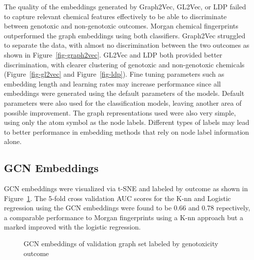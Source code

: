 \documentclass[
  super,
  preprint,
  3p]{elsarticle}
\begin{document}
The quality of the embeddings generated by Graph2Vec, GL2Vec, or LDP
failed to capture relevant chemical features effectively to be able to
discriminate between genotoxic and non-genotoxic outcomes. Morgan
chemical fingerprints outperformed the graph embeddings using both
classifiers. Graph2Vec struggled to separate the data, with almost no
discrimination between the two outcomes as shown in
Figure~\ref{fig-graph2vec}. GL2Vec and LDP both provided better
discrimination, with clearer clustering of genotoxic and non-genotoxic
chemicals (Figure~\ref{fig-gl2vec} and Figure~\ref{fig-ldp}). Fine
tuning parameters such as embedding length and learning rates may
increase performance since all embeddings were generated using the
default parameters of the models. Default parameters were also used for
the classification models, leaving another area of possible improvement.
The graph representations used were also very simple, using only the
atom symbol as the node labels. Different types of labels may lead to
better performance in embedding methods that rely on node label
information alone.

\subsection{GCN Embeddings}\label{gcn-embeddings}

GCN embeddings were visualized via t-SNE and labeled by outcome as shown
in Figure~\ref{fig-gcn-nn}. The 5-fold cross validation AUC scores for
the K-nn and Logistic regression using the GCN embeddings were found to
be 0.66 and 0.78 repectively, a comparable performance to Morgan
fingerprints using a K-nn approach but a marked improved with the
logistic regression.

\begin{figure}[H]


\caption{\label{fig-gcn-nn}GCN embeddings of validation graph set
labeled by genotoxicity outcome}

\end{figure}%
\end{document}

